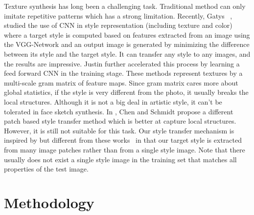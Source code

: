 \documentclass[10pt,twocolumn,letterpaper]{article}
\begin{document}
Texture synthesis has long been a challenging task. Traditional method can only imitate repetitive patterns which has a strong limitation. Recently, Gatys \etal ~\cite{gatys2015texture,gatys2015neural}, studied the use of CNN in style representation (including texture and color) where a target style is computed based on features extracted from an image using the VGG-Network and an output image is generated by minimizing the difference between its style and the target style. It can transfer any style to any images, and the results are impressive. Justin \etal \cite{feifei2016} further accelerated this process by learning a feed forward CNN in the training stage. These methods represent textures by a multi-scale gram matrix of feature maps. Since gram matrix cares more about global statistics, if the style is very different from the photo, it usually breaks the local structures. Although it is not a big deal in artistic style, it can't be tolerated in face sketch synthesis. In \cite{Chen2016Patch}, Chen and Schmidt propose a different patch based style transfer method which is better at capture local structures. However, it is still not suitable for this task. Our style transfer mechanism is inspired by but different from these works~\cite{gatys2015texture,gatys2015neural,feifei2016} in that our target style is extracted from many image patches rather than from a single style image. Note that there usually does not exist a single style image in the training set that matches all properties of the test image. 

\section{Methodology}
\end{document}
